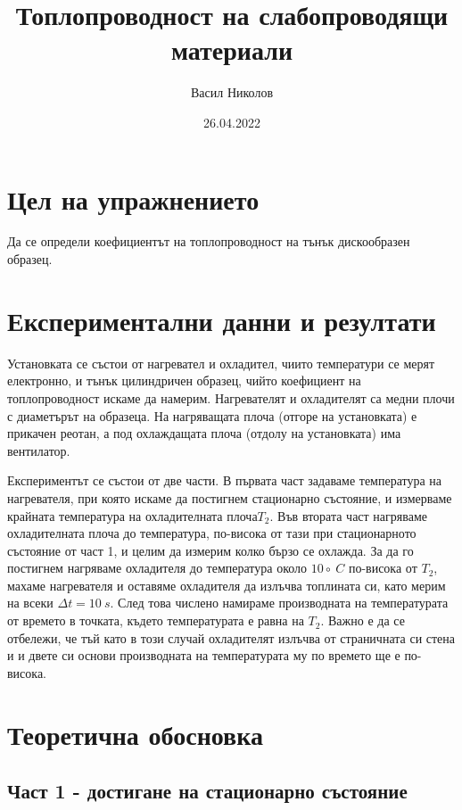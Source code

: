 \documentclass[reprint,amsmath,amssymb,aps]{revtex4-2}
\begin{document}
\setlength{\abovedisplayskip}{3pt}
\setlength{\belowdisplayskip}{3pt}    

\title{Топлопроводност на слабопроводящи материали}

\author{Васил Николов}
\date{26.04.2022}
\maketitle


\section{Цел на упражнението}

Да се определи коефициентът на топлопроводност на тънък дискообразен образец. 


\section{Експериментални данни и резултати}

Установката се състои от нагревател и охладител, чиито температури се мерят електронно, и тънък цилиндричен образец, чийто коефициент на топлопроводност искаме да намерим. Нагревателят и охладителят са медни плочи с диаметърът на образеца. На нагряващата плоча (отгоре на установката) е прикачен реотан, а под охлаждащата плоча (отдолу на установката) има вентилатор. 

Експериментът се състои от две части. В първата част задаваме температура на нагревателя, при която искаме да постигнем стационарно състояние, и измерваме крайната температура на охладителната плоча$T_2$. Във втората част нагряваме охладителната плоча до температура, по-висока от тази при стационарното състояние от част 1, и целим да измерим колко бързо се охлажда. За да го постигнем нагряваме охладителя до температура около $10\circ \ C$ по-висока от $T_2$, махаме нагревателя и оставяме охладителя да излъчва топлината си, като мерим на всеки $\Delta t = 10 \ \si{s}$. След това числено намираме производната на температурата от времето в точката, където температурата е равна на $T_2$. Важно е да се отбележи, че тъй като в този случай охладителят излъчва от страничната си стена и и двете си основи производната на температурата му по времето ще е по-висока. 


\section{Теоретична обосновка}
\subsection{Част 1 - достигане на стационарно състояние}
\end{document}
